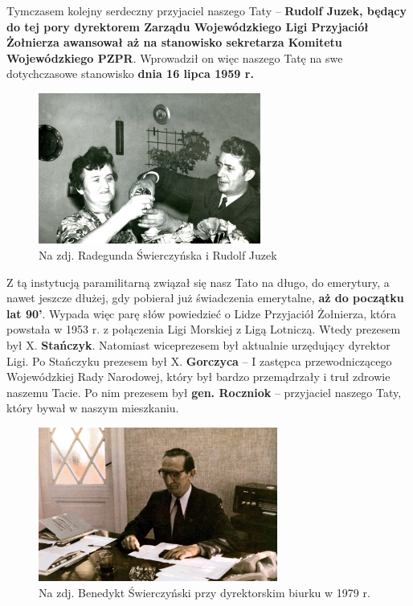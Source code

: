 Tymczasem kolejny serdeczny przyjaciel naszego Taty – \textbf{Rudolf Juzek, będący do tej pory dyrektorem Zarządu Wojewódzkiego Ligi Przyjaciół Żołnierza awansował aż na stanowisko sekretarza Komitetu Wojewódzkiego PZPR}. Wprowadził on więc naszego Tatę na swe dotychczasowe stanowisko \textbf{dnia 16 lipca 1959 r.}
\begin{figure}[!h]
\begin{center}
\includegraphics[width=0.65\textwidth]{photo/radegunda_swierczynska_rudolf_juzek.jpg}
\caption[Radegunda Świerczyńska i Rudolf Juzek]{Na zdj. Radegunda Świerczyńska i Rudolf Juzek}
\end{center}
\end{figure}

Z tą instytucją paramilitarną związał się nasz Tato na długo, do emerytury, a nawet jeszcze dłużej, gdy pobierał już świadczenia emerytalne, \textbf{aż do początku lat 90’}. Wypada więc parę słów powiedzieć o Lidze Przyjaciół Żołnierza, która powstała w 1953 r. z połączenia Ligi Morskiej z Ligą Lotniczą. Wtedy prezesem był X. \textbf{Stańczyk}. Natomiast wiceprezesem był aktualnie urzędujący dyrektor Ligi. Po Stańczyku prezesem był X. \textbf{Gorczyca} -- I zastępca przewodniczącego Wojewódzkiej Rady Narodowej, który był bardzo przemądrzały i truł zdrowie naszemu Tacie. Po nim prezesem był \textbf{gen. Roczniok} – przyjaciel naszego Taty, który bywał w naszym mieszkaniu.
\begin{figure}[!h]
\begin{center}
\includegraphics[width=0.7\textwidth]{photo/benedykt_swierczynski_1979.jpg}
\caption[Benedykt Świerczyński przy dyrektorskim biurku w 1979 r.]{Na zdj. Benedykt Świerczyński przy dyrektorskim biurku w 1979 r.}
\end{center}
\end{figure}

